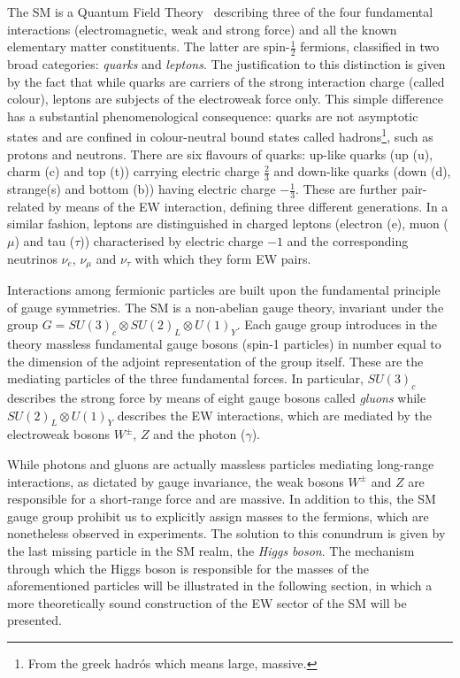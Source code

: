 The SM is a Quantum Field Theory~\cite{Glashow:1961tr,Weinberg:1967tq,Salam:1968rm} describing three of the four fundamental interactions (electromagnetic, weak and strong force)
and all the known elementary matter constituents. The latter are spin-$\frac{1}{2}$ fermions, classified in two broad categories: \textit{quarks} and 
\textit{leptons}.
The justification to this distinction is given by the fact that while quarks are carriers of the strong interaction charge (called colour), leptons are subjects of the electroweak force only. 
This simple difference has a substantial phenomenological consequence: quarks are not asymptotic states and are confined in colour-neutral bound states called hadrons\footnote{From the greek hadrós which means large, massive.}, such as protons and neutrons. There are six flavours of quarks: up-like quarks (up (u), 
charm (c) and top (t)) carrying electric charge $\frac{2}{3}$ and down-like quarks (down (d), strange(s) and bottom (b)) having electric
charge $-\frac{1}{3}$. These are further pair-related by means of the EW interaction, defining three different generations.
In a similar fashion, leptons are distinguished in charged leptons (electron (e), muon ($\mu$) and tau ($\tau$)) characterised by 
electric charge $-1$ and the corresponding neutrinos $\nu_e$, $\nu_{\mu}$ and $\nu_{\tau}$ with which they form EW pairs.

Interactions among fermionic particles are built upon the fundamental principle of gauge symmetries. The SM is a non-abelian
gauge theory, invariant under the group $G = SU(3)_c \otimes SU(2)_L \otimes U(1)_Y$. Each gauge group introduces in the theory 
massless fundamental gauge bosons (spin-1 particles) in number equal to the dimension of the adjoint representation of the group itself. 
These are the mediating particles of the three fundamental forces. In particular, $SU(3)_c$ describes the strong force by 
means of eight gauge bosons called \textit{gluons} while $SU(2)_L \otimes U(1)_Y$ describes the EW interactions, which are mediated 
by the electroweak bosons $W^\pm$, $Z$ and the photon ($\gamma$).

While photons and gluons are actually massless particles mediating long-range interactions, as dictated by gauge invariance,
the weak bosons $W^\pm$ and $Z$ are responsible for a short-range force and are massive. In addition to this, the SM gauge group prohibit us
to explicitly assign masses to the fermions, which are nonetheless observed in experiments. The solution to this conundrum is
given by the last missing particle in the SM realm, the \textit{Higgs boson}. The mechanism through which the Higgs boson is responsible for
the masses of the aforementioned particles will be illustrated in the following section, in which a more theoretically sound construction of
the EW sector of the SM will be presented.
